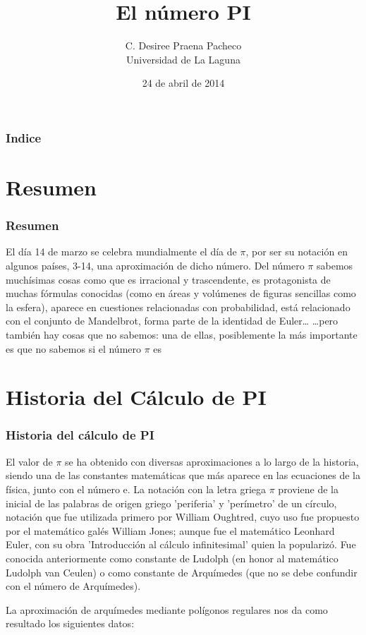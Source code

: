 \documentclass {beamer}
\title[Presentacion con Beamer]{El número PI}
\author[Desiree]{C. Desiree Praena Pacheco\\Universidad de La Laguna}
\institute{ULL}
\date[xxxxxxxxxxxx]{24 de abril de 2014}
\begin{document}
\begin{frame}
\titlepage
\end{frame}

\begin{frame}
\frametitle{Indice}
\tableofcontents[pausesections]
\end{frame}

\section{Resumen}

\begin{frame}
\frametitle{Resumen}

El día 14 de marzo se celebra mundialmente el día de $\pi$, por ser su notación en algunos países, 3-14, una aproximación de dicho número.
Del número $\pi$ sabemos muchísimas cosas como que es irracional y trascendente, es protagonista de muchas fórmulas conocidas (como en áreas y volúmenes de figuras sencillas como la esfera), aparece en cuestiones relacionadas con probabilidad, está relacionado con el conjunto de Mandelbrot, forma parte de la identidad de Euler…
…pero también hay cosas que no sabemos: una de ellas, posiblemente la más importante es que no sabemos si el número $\pi$ es 

\end{frame}

\section{Historia del Cálculo de PI}
\begin{frame}
\frametitle{Historia del cálculo de PI}

El valor de $\pi$ se ha obtenido con diversas aproximaciones a lo largo de la historia, siendo una de las constantes matemáticas que más aparece en las ecuaciones de la física, junto con el número e.
La notación con la letra griega $\pi$ proviene de la inicial de las palabras de origen griego 'periferia' y 'perímetro' de un círculo, notación que fue utilizada primero por William Oughtred, cuyo uso fue propuesto por el matemático galés William Jones; aunque fue el matemático Leonhard Euler, con su obra 'Introducción al cálculo infinitesimal' quien la popularizó. Fue conocida anteriormente como constante de Ludolph (en honor al matemático Ludolph van Ceulen) o como constante de Arquímedes (que no se debe confundir con el número de Arquímedes).

La aproximación de arquímedes mediante polígonos regulares nos da como resultado los siguientes datos:

\end{frame}
\end{document}
